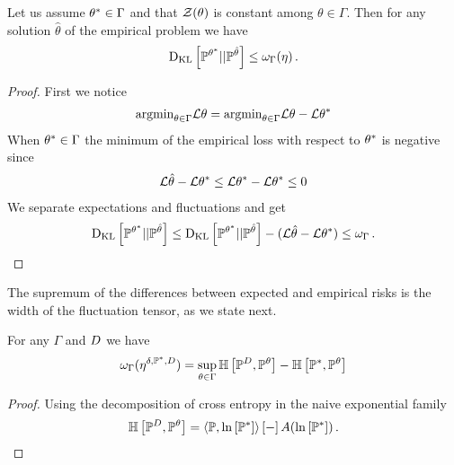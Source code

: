 \begin{theorem}
	Let us assume $\theta^*\in\Gamma$ and that $\mathcal{Z}{\left(\theta\right)}$ is constant among $\theta\in\Gamma$.
	Then for any solution $\hat{\theta}$ of the empirical problem we have
	\begin{align}
		\mathrm{D}_{\mathrm{KL}}\left[ \mathbb{P}^{\theta^*} || \mathbb{P}^{\hat{\theta}} \right] \leq \omega_{\Gamma}(\eta) \, .
	\end{align}
\end{theorem}
\begin{proof}
	First we notice
	\begin{align}
		\mathrm{argmin}_{\theta\in\Gamma} \mathcal{L}\theta = \mathrm{argmin}_{\theta\in\Gamma} \mathcal{L}\theta - \mathcal{L}\theta^* 
	\end{align}
	When $\theta^*\in\Gamma$ the minimum of the empirical loss with respect to $\theta^*$ is negative since
	\begin{align}
		\mathcal{L}\hat{\theta} - \mathcal{L}\theta^* \leq \mathcal{L}\theta^*-\mathcal{L}\theta^* \leq 0
	\end{align}
	We separate expectations and fluctuations and get
	\begin{align}
		\mathrm{D}_{\mathrm{KL}}\left[ \mathbb{P}^{\theta^*} || \mathbb{P}^{\hat{\theta}} \right] \leq \mathrm{D}_{\mathrm{KL}}\left[ \mathbb{P}^{\theta^*} || \mathbb{P}^{\hat{\theta}} \right] - (\mathcal{L}\hat{\theta} - \mathcal{L}\theta^*) \leq \omega_{\Gamma} \, .
	\end{align}
\end{proof}





The supremum of the differences between expected and empirical risks is the width of the fluctuation tensor, as we state next.

\begin{lemma}
	For any $\Gamma$ and $D$ we have
	\begin{align*}
		\omega_{\Gamma}(\eta^{\delta, \mathbb{P}^*, D}) 
		= \sup_{\theta\in\Gamma} \mathbb{H}\left[\mathbb{P}^{D},\mathbb{P}^{\theta}\right] - \mathbb{H}\left[\mathbb{P}^*,\mathbb{P}^{\theta}\right] 
	\end{align*}
\end{lemma}
\begin{proof}
	Using the decomposition of cross entropy in the naive exponential family 
	 	\[ \mathbb{H}\left[\mathbb{P}^{D},\mathbb{P}^{\theta}\right]=\left\langle \mathbb{P},\ln \left[ \mathbb{P}^* \right]\right\rangle \left[ - \right] A(\ln \left[ \mathbb{P}^* \right]) \, . \]
\end{proof}


